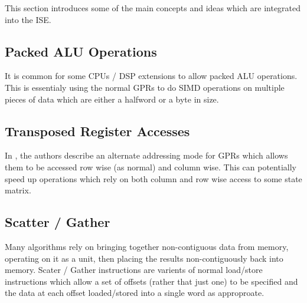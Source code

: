 
This section introduces some of the main concepts and ideas which are
integrated into the ISE.

\subsection{Packed ALU Operations}

It is common for some CPUs / DSP extensions to allow packed ALU operations.
This is essentialy using the normal GPRs to do SIMD operations on multiple
pieces of data which are either a halfword or a byte in size.

\subsection{Transposed Register Accesses}

In \cite{jung2000register}, the authors describe an alternate addressing mode
for GPRs which allows them to be accessed row wise (as normal) and
column wise. This can potentially speed up operations which rely on both
column and row wise access to some state matrix.

\subsection{Scatter / Gather}

Many algorithms rely on bringing together non-contiguous data from memory,
operating on it as a unit, then placing the results non-contiguously back
into memory. Scater / Gather instructions are varients of normal load/store
instructions which allow a set of offsets (rather that just one) to be
specified and the data at each offset loaded/stored into a single word
as approproate.

